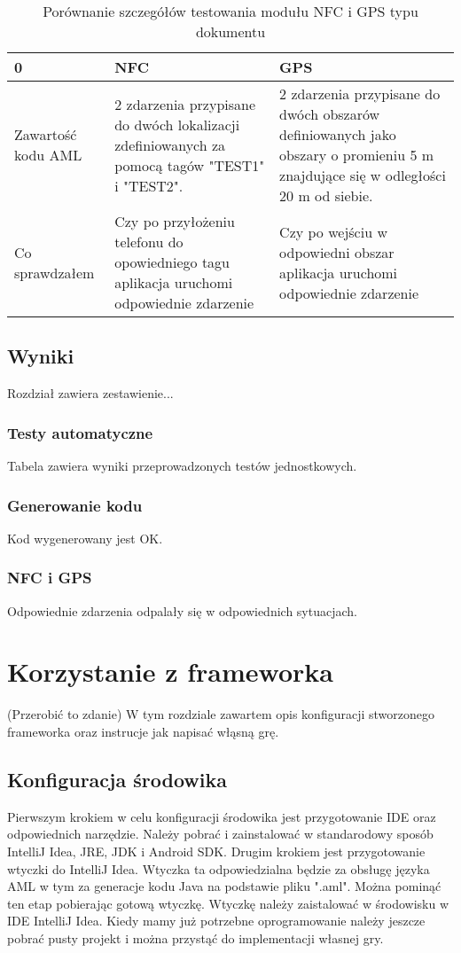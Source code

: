 \documentclass	{xmgr}
\begin{document}
\begin{table}[!tbh]
	\begin{tabular}{|l|l|l|} \hline
		0 & NFC & GPS \\ \hline
		Zawartość kodu AML & 2 zdarzenia przypisane do dwóch lokalizacji zdefiniowanych za pomocą tagów "TEST1" i "TEST2". & 2 zdarzenia przypisane do dwóch obszarów definiowanych jako obszary o promieniu 5 m znajdujące się w odległości 20 m od siebie. \\ \hline
		Co sprawdzałem  & Czy po przyłożeniu telefonu do opowiedniego tagu aplikacja uruchomi odpowiednie zdarzenie & Czy po wejściu w odpowiedni obszar aplikacja uruchomi odpowiednie zdarzenie \\ \hline
	\end{tabular}
	\caption{Porównanie szczegółów testowania modułu NFC i GPS
		typu dokumentu}
\end{table}

\section{Wyniki}
Rozdział zawiera zestawienie...

\subsection{Testy automatyczne}
Tabela zawiera wyniki przeprowadzonych testów jednostkowych.

\subsection{Generowanie kodu}
Kod wygenerowany jest OK.

\subsection{NFC i GPS}
Odpowiednie zdarzenia odpalały się w odpowiednich sytuacjach.


\chapter{Korzystanie z frameworka}
(Przerobić to zdanie)
W tym rozdziale zawartem opis konfiguracji stworzonego frameworka oraz instrucje jak napisać włąsną grę. 
\section{Konfiguracja środowika}
Pierwszym krokiem w celu konfiguracji środowika jest przygotowanie IDE oraz odpowiednich narzędzie. Należy pobrać i zainstalować w standarodowy sposób IntelliJ Idea, JRE, JDK i Android SDK. Drugim krokiem jest przygotowanie wtyczki do IntelliJ Idea. Wtyczka ta odpowiedzialna będzie za obsługę języka AML w tym za generacje kodu Java na podstawie pliku ".aml". Można pominąć ten etap pobierając gotową wtyczkę. Wtyczkę należy zaistalować w środowisku w IDE IntelliJ Idea. Kiedy mamy już potrzebne oprogramowanie należy jeszcze pobrać pusty projekt i można przystąć do implementacji własnej gry. 
\end{document}
